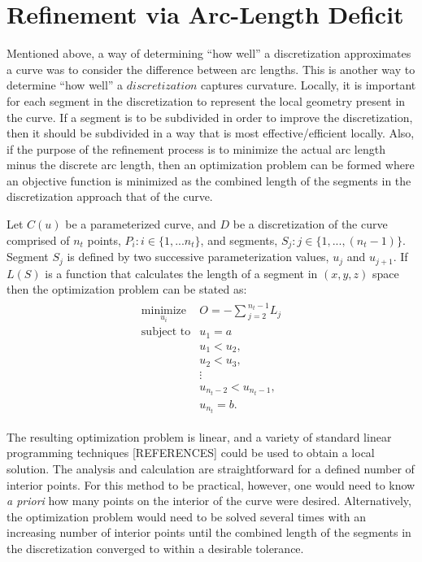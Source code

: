 \section{Refinement via Arc-Length Deficit}
Mentioned above, a way of determining ``how well'' a discretization approximates a curve was to consider the difference between arc lengths. This is another way to determine ``how well'' a $discretization$ captures curvature. Locally, it is important for each segment in the discretization to represent the local geometry present in the curve. If a segment is to be subdivided in order to improve the discretization, then it should be subdivided in a way that is most effective/efficient locally. Also, if the purpose of the refinement process is to minimize the actual arc length minus the discrete arc length, then an optimization problem can be formed where an objective function is minimized as the combined length of the segments in the discretization approach that of the curve.

Let $C(u)$ be a parameterized curve, and $D$ be a discretization of the 
curve comprised of $n_t$ points, $P_i : i \in \{1,...n_t\}$, and segments, $S_j : j \in \{1,...,(n_t-1)\}$. Segment $S_j$ is defined by two successive parameterization values, $u_j$ and $u_{j+1}$. If $L(S)$ is a function that calculates the length of a segment in $(x,y,z)$ space then the optimization problem can be stated as:
\begin{eqnarray*}
\begin{array}{cl}
\underset{u_i}{\text{minimize}} & O=-\sum{_{j=2}^{n_t-1}L_j} \\
\text{subject to} & u_1 = a \\
& u_1 < u_2, \\ 
& u_2 < u_3, \\
& \vdots \\
& u_{n_t-2} < u_{n_t-1},\\ 
& u_{n_t} = b.
\end{array}
\end{eqnarray*}

\noindent The resulting optimization problem is linear, and a 
variety of standard linear programming techniques [REFERENCES] could be 
used to obtain a local solution. The analysis 
and calculation are straightforward for a defined number of interior 
points. For this method to be practical, however, one would need to know 
{\it{a priori}} how many points on the interior of the curve were desired. 
Alternatively, the optimization problem would need to be solved 
several times with an increasing number of interior points until the 
combined length of the segments in the discretization converged to within 
a desirable tolerance.

